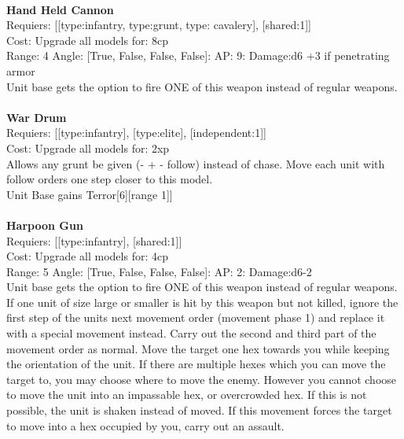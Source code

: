 \ \\
{\bf Hand Held Cannon } \\

Requiers: [[type:infantry, type:grunt, type: cavalery], [shared:1]] \\
Cost: Upgrade all models for: 8cp \\


Range: 4  Angle: [True, False, False, False]: AP: 9: Damage:d6 +3 if penetrating armor \\
Unit base gets the option to fire ONE of this weapon instead of regular weapons.\\ 








\ \\
{\bf War Drum } \\

Requiers: [[type:infantry], [type:elite], [independent:1]] \\
Cost: Upgrade all models for: 2xp \\
Allows any grunt be given (- + - follow) instead of chase. Move each unit with follow orders one step closer to this model.\\ 
Unit Base gains Terror[6][range 1]]\\ 









\ \\
{\bf Harpoon Gun } \\

Requiers: [[type:infantry], [shared:1]] \\
Cost: Upgrade all models for: 4cp \\


Range: 5  Angle: [True, False, False, False]: AP: 2: Damage:d6-2 \\
Unit base gets the option to fire ONE of this weapon instead of regular weapons.\\ 
If one unit of size large or smaller is hit by this weapon but not killed, ignore the first step of the units next movement order (movement phase 1) and replace it with a special movement instead. Carry out the second and third part of the movement order as normal. Move the target one hex towards you while keeping the orientation of the unit. If there are multiple hexes which you can move the target to, you may choose where to move the enemy. However you cannot choose to move the unit into an impassable hex, or overcrowded hex. If this is not possible, the unit is shaken instead of moved. If this movement forces the target to move into a hex occupied by you, carry out an assault.\\ 









